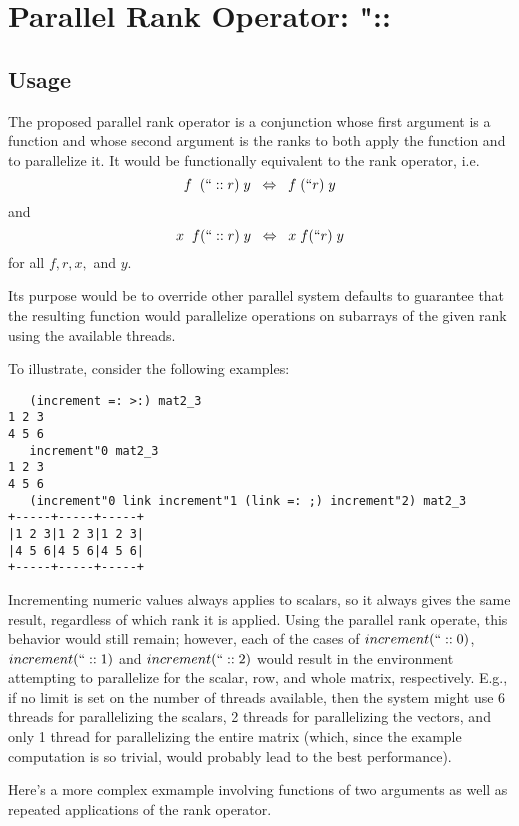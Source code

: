 \section{Parallel Rank Operator: \ttfamily"::\normalfont}
\label{prank}

\subsection{Usage}
The proposed parallel rank operator is a conjunction 
whose first argument is a function 
and whose second argument is the ranks to both apply the function and to parallelize it. 
It would be functionally equivalent to the rank operator, i.e. 
\[f\;\;(``::r)\;y\;\;\Leftrightarrow\;\;f\;(``r)\;y\] and \[x\;\;f(``::r)\;y\;\;\Leftrightarrow\;\;x\;f(``r)\;y\] for all $f, r, x,$ and $y$.

Its purpose would be to override other parallel system defaults 
to guarantee that the resulting function would parallelize operations on subarrays of the given rank 
using the available threads.

To illustrate, consider the following examples:

\begin{singlespacing}
\begin{small}
\begin{verbatim}
   (increment =: >:) mat2_3
1 2 3
4 5 6
   increment"0 mat2_3
1 2 3
4 5 6
   (increment"0 link increment"1 (link =: ;) increment"2) mat2_3
+-----+-----+-----+
|1 2 3|1 2 3|1 2 3|
|4 5 6|4 5 6|4 5 6|
+-----+-----+-----+
\end{verbatim}
\end{small}
\end{singlespacing}

Incrementing numeric values always applies to scalars, so it always gives the same result, 
regardless of which rank it is applied. 
Using the parallel rank operate, this behavior would still remain; 
however, each of the cases of $increment(``::0)$, $increment(``::1)$ and $increment(``::2)$ 
would result in the environment attempting to parallelize for the scalar, row, and whole matrix, respectively.
E.g., if no limit is set on the number of threads available, 
then the system might use 6 threads for parallelizing the scalars, 
2 threads for parallelizing the vectors, 
and only 1 thread for parallelizing the entire matrix 
(which, since the example computation is so trivial, would probably lead to the best performance).

Here's a more complex exmample involving functions of two arguments 
as well as repeated applications of the rank operator.

